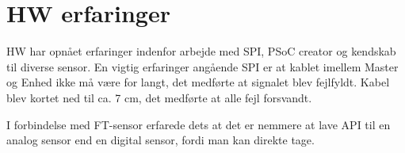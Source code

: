 \section{HW erfaringer}

HW har opnået erfaringer indenfor arbejde med SPI, PSoC creator og kendskab til diverse sensor. En vigtig erfaringer angående SPI er at kablet imellem Master og Enhed ikke må være for langt, det medførte at signalet blev fejlfyldt. Kabel blev kortet ned til ca. 7 cm, det medførte at alle fejl forsvandt.

I forbindelse med FT-sensor erfarede dets at det er nemmere at lave API til en analog sensor end en digital sensor, fordi man kan direkte tage.